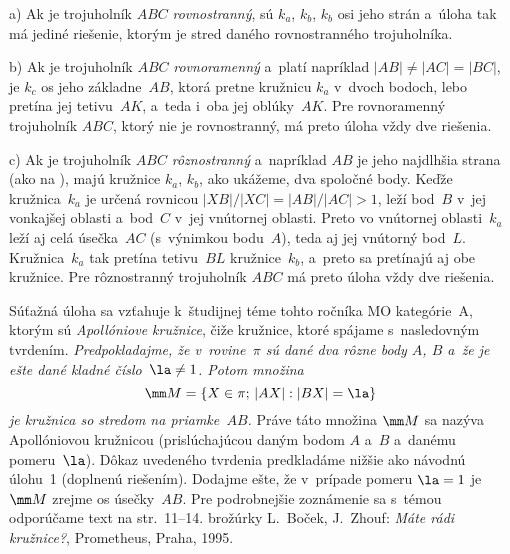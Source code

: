 {\diskusia
\item{a)}
Ak je trojuholník $ABC$ {\it rovnostranný}, sú $k_a$, $k_b$, $k_b$ osi jeho
strán a~úloha tak má jediné riešenie, ktorým je stred daného
rovnostranného trojuholníka.
\item{b)}
Ak je trojuholník $ABC$ {\it rovnoramenný\/} a~platí napríklad
$|AB|\ne|AC|=|BC|$, je $k_c$ os jeho základne~$AB$, ktorá pretne
kružnicu $k_a$ v~dvoch bodoch, lebo pretína jej tetivu~$AK$,
a~teda i~oba jej oblúky~$AK$.
Pre rovnoramenný trojuholník $ABC$, ktorý nie je rovnostranný, má preto
úloha vždy dve riešenia.
\item{c)}
Ak je trojuholník $ABC$ {\it rôznostranný\/} a~napríklad $AB$ je jeho
najdlhšia strana (ako na ),
majú kružnice $k_a$, $k_b$, ako ukážeme, dva spoločné body.
Keďže kružnica~$k_a$ je určená rovnicou $|XB|/|XC|=|AB|/|AC|>1$,
leží bod~$B$ v~jej vonkajšej oblasti a~bod~$C$ v~jej
vnútornej oblasti. Preto vo vnútornej oblasti~$k_a$ leží aj celá úsečka~$AC$
(s~výnimkou bodu~$A$), teda aj jej vnútorný bod~$L$.
Kružnica~$k_a$ tak pretína tetivu~$BL$ kružnice~$k_b$, a~preto
sa pretínajú aj obe kružnice. Pre rôznostranný trojuholník $ABC$ má preto úloha
vždy dve riešenia.

\titem
Súťažná úloha sa vzťahuje k~študijnej téme tohto ročníka MO
kategórie~A, ktorým sú {\it Apollóniove kružnice}, čiže
kružnice, ktoré spájame s~nasledovným tvrdením.
{\endgraf}
{\sl Predpokladajme, že v~rovine~$\pi$ sú dané dva rôzne body $A$, $B$
a~že je ešte dané kladné číslo~$\la\ne1$. Potom množina
$$
\mm M=\{X\in\pi;\,|AX|:|BX|=\la\}
$$
je kružnica so stredom na priamke~$AB$.}
Práve táto množina $\mm M$ sa nazýva Apollóniovou kružnicou
(prislúchajúcou daným bodom $A$ a~$B$ a~danému pomeru~$\la$).
{\endgraf}
Dôkaz uvedeného tvrdenia
predkladáme nižšie ako návodnú úlohu~1
(doplnenú riešením). Dodajme ešte, že v~prípade pomeru $\la=1$
je $\mm M$ zrejme os úsečky~$AB$.
Pre podrobnejšie zoznámenie sa s~témou odporúčame
text na str.~11--14. brožúrky L.~Boček, J.~Zhouf:
{\it Máte rádi kružnice?}, Prometheus, Praha, 1995.

}
